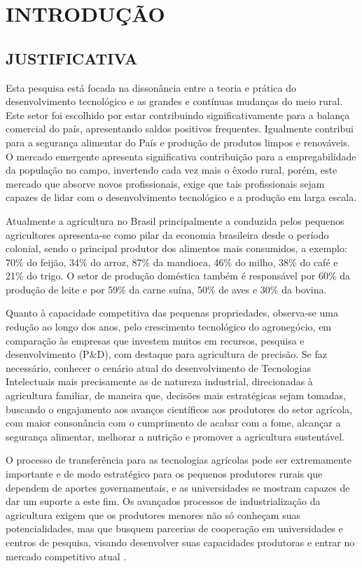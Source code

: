 \chapter{INTRODUÇÃO}



\section{JUSTIFICATIVA}

Esta pesquisa está focada na dissonância entre a teoria e prática do desenvolvimento tecnológico e as grandes e contínuas mudanças do meio rural. Este setor foi escolhido por estar contribuindo significativamente para a balança comercial do país, apresentando saldos positivos frequentes. Igualmente contribui para a segurança alimentar do País e produção de produtos limpos e renováveis. O mercado emergente apresenta significativa contribuição para a empregabilidade da população no campo, invertendo cada vez mais o êxodo rural, porém, este mercado que absorve novos profissionais, exige que tais profissionais sejam capazes de lidar com o desenvolvimento tecnológico e a produção em larga escala. 

Atualmente a agricultura no Brasil principalmente a conduzida pelos pequenos agricultores apresenta-se como pilar da economia brasileira desde o período colonial, sendo o principal produtor dos alimentos mais consumidos, a exemplo: 70\% do feijão, 34\% do arroz, 87\% da mandioca, 46\% do milho, 38\% do café e 21\% do trigo. O setor de produção doméstica também é responsável por 60\% da produção de leite e por 59\% da carne suína, 50\% de aves e 30\% da bovina. 

Quanto à capacidade competitiva das pequenas propriedades, observa-se uma redução ao longo dos anos, pelo crescimento tecnológico do agronegócio, em comparação às empresas que investem muitos em recursos, pesquisa e desenvolvimento (P&D), com destaque para agricultura de precisão. Se faz necessário, conhecer o cenário atual do desenvolvimento de Tecnologias Intelectuais mais precisamente as de natureza industrial, direcionadas à agricultura familiar, de maneira que, decisões mais estratégicas sejam tomadas, buscando o engajamento aos avanços científicos aos produtores do setor agrícola, com maior consonância com o cumprimento de acabar com a fome, alcançar a segurança alimentar, melhorar a nutrição e promover a agricultura sustentável.


O processo de transferência para as tecnologias agrícolas pode ser extremamente importante e de modo estratégico para os pequenos produtores rurais que dependem de aportes governamentais, e as universidades se mostram capazes de dar um suporte a este fim. Os avançados processos de industrialização da agricultura exigem que os produtores menores não só conheçam suas potencialidades, mas que busquem parcerias de cooperação em universidades e centros de pesquisa, visando desenvolver suas capacidades produtoras e entrar no mercado competitivo atual \cite{silva_modelo_2016}.

